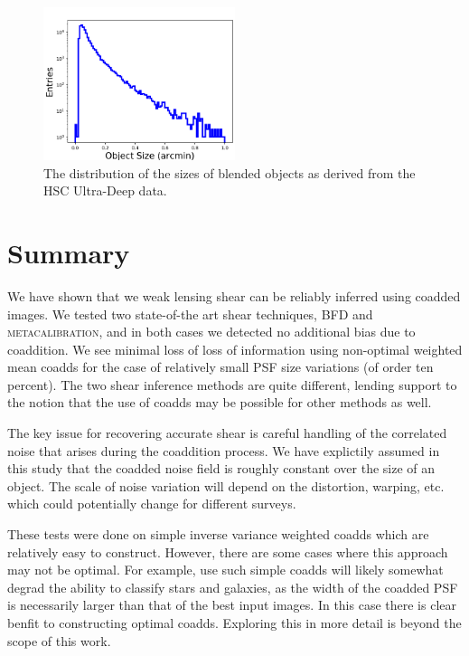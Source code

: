 \documentclass[fleqn,useAMS,usenatbib]{mnras}
\newcommand\rachel[1]{\todo[color=yellow, inline, size=\small]{Rachel: #1}}
\newcommand{\mcal}{\textsc{metacalibration}}
\begin{document}
\begin{figure}
\includegraphics[width=0.5\textwidth]{object_size.png}
\caption{
The distribution of the sizes of blended objects as derived from the HSC 
Ultra-Deep data.
\rachel{Say how size is defined.}
}
\label{fig:size}
\end{figure}

\section{Summary}
\label{Section:Summary}

We have shown that we weak lensing shear can be reliably inferred using coadded
images.  We tested two state-of-the art shear techniques, BFD and \mcal, and in
both cases we detected no additional bias due to coaddition.  We see minimal
loss of loss of information using non-optimal weighted mean coadds for the case
of relatively small PSF size variations (of order ten percent).  The two shear
inference methods are quite different, lending support to the notion that the
use of coadds may be possible for other methods as well.

The key issue for recovering accurate shear is careful handling of the
correlated noise that arises during the coaddition process.  We have explictily
assumed in this study that the coadded noise field is roughly constant over the
size of an object.  The scale of noise variation will depend on the distortion,
warping, etc. which could potentially change for different surveys.

These tests were done on simple inverse variance weighted coadds which are
relatively easy to construct.  However, there are some cases where this
approach may not be optimal.  For example, use such simple coadds will likely
somewhat degrad the ability to classify stars and galaxies, as the width of the
coadded PSF is necessarily larger than that of the best input images.  In this
case there is  clear benfit to constructing optimal coadds.  Exploring this in
more detail is beyond the scope of this work.
\end{document}
